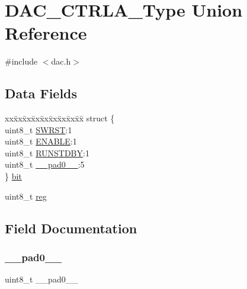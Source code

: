 \hypertarget{union_d_a_c___c_t_r_l_a___type}{}\section{D\+A\+C\+\_\+\+C\+T\+R\+L\+A\+\_\+\+Type Union Reference}
\label{union_d_a_c___c_t_r_l_a___type}


{\ttfamily \#include $<$dac.\+h$>$}

\subsection*{Data Fields}
\begin{DoxyCompactItemize}
\item 
\begin{tabbing}
xx\=xx\=xx\=xx\=xx\=xx\=xx\=xx\=xx\=\kill
struct \{\\
\>uint8\_t \mbox{\hyperlink{union_d_a_c___c_t_r_l_a___type_a9334d5ac0548802c90a8129c52c8e490}{SWRST}}:1\\
\>uint8\_t \mbox{\hyperlink{union_d_a_c___c_t_r_l_a___type_a2b3662f1b123463ae1a23c1f324e5cc5}{ENABLE}}:1\\
\>uint8\_t \mbox{\hyperlink{union_d_a_c___c_t_r_l_a___type_aa24338c5cacc63e3b77adf2dc0938ff6}{RUNSTDBY}}:1\\
\>uint8\_t \mbox{\hyperlink{union_d_a_c___c_t_r_l_a___type_a8b4eebe79ded0459acec2f4950102ba3}{\_\_pad0\_\_}}:5\\
\} \mbox{\hyperlink{union_d_a_c___c_t_r_l_a___type_a168eb3cc5c511144f111f4d91e3179c4}{bit}}\\

\end{tabbing}\item 
uint8\+\_\+t \mbox{\hyperlink{union_d_a_c___c_t_r_l_a___type_a9428adc9af4653a2050e2536b55dec8d}{reg}}
\end{DoxyCompactItemize}


\subsection{Field Documentation}
\mbox{\label{union_d_a_c___c_t_r_l_a___type_a8b4eebe79ded0459acec2f4950102ba3}} 
\subsubsection{\texorpdfstring{\_\_pad0\_\_}{\_\_pad0\_\_}}
{\footnotesize\ttfamily uint8\+\_\+t \+\_\+\+\_\+pad0\+\_\+\+\_\+}

